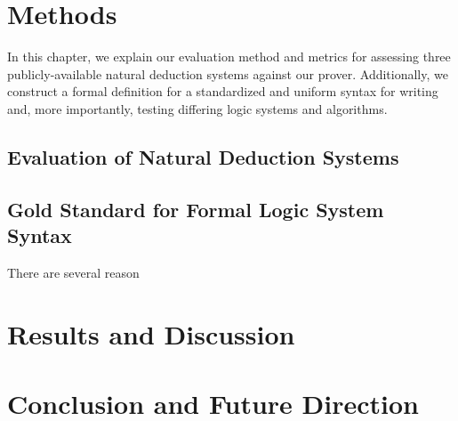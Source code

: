 \documentclass[ms]{uncgdissertationexp2}
\theoremstyle{plain}
\theoremstyle{definition}
\theoremstyle{remark}
\begin{document}
\chapter{Methods}
    In this chapter, we explain our evaluation method and metrics for assessing three publicly-available natural deduction systems against our prover. Additionally, we construct a formal definition for a standardized and uniform syntax for writing and, more importantly, testing differing logic systems and algorithms.
    \section{Evaluation of Natural Deduction Systems}
    \section{Gold Standard for Formal Logic System Syntax}
    There are several reason 
\chapter{Results and Discussion}
\chapter{Conclusion and Future Direction}


\end{document}
